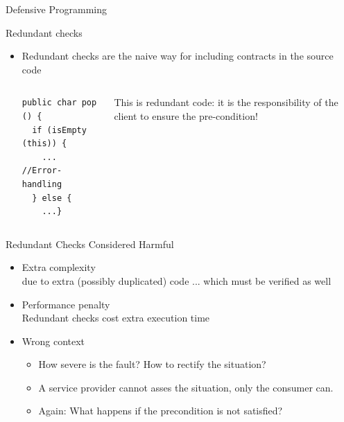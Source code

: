 \begin{frame}[fragile]{Defensive Programming}
  \begin{block}{Redundant checks}
    \begin{itemize}
    \item Redundant checks are the naive way for including contracts in the
      source code
    \begin{columns}
      \begin{column}{.4\linewidth}
        \begin{Verbatim}
public char pop () {
  if (isEmpty (this)) {
    ... //Error-handling
  } else {
    ...}          
        \end{Verbatim}
      \end{column}
      \begin{column}{.6\linewidth}
        This is redundant code: it is the responsibility of the client to
        ensure the pre-condition!
      \end{column}
    \end{columns}
    \end{itemize}
  \end{block}

  \begin{block}{Redundant Checks Considered Harmful}
    \begin{itemize}
    \item Extra complexity\\
      {\small due to extra (possibly duplicated) code ... which must be
        verified as well}
    \item Performance penalty\\
      {\small Redundant checks cost extra execution time}
    \item Wrong context
      \begin{itemize}
      \item How severe is the fault? How to rectify the situation?
      \item A service provider cannot asses the situation, only the consumer
        can.
      \item Again: What happens if the precondition is not satisfied?
      \end{itemize}
    \end{itemize}
  \end{block}
\end{frame}

